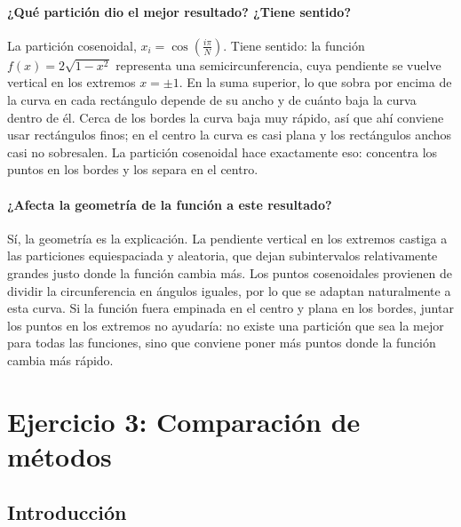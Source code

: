 \paragraph{¿Qué partición dio el mejor resultado? ¿Tiene sentido?}
La partición cosenoidal, \(x_i=\cos\left(\frac{i\pi}{N}\right)\). Tiene sentido: la función \(f(x)=2\sqrt{1-x^2}\) representa una semicircunferencia, cuya pendiente se vuelve vertical en los extremos \(x=\pm1\). En la suma superior, lo que sobra por encima de la curva en cada rectángulo depende de su ancho y de cuánto baja la curva dentro de él. Cerca de los bordes la curva baja muy rápido, así que ahí conviene usar rectángulos finos; en el centro la curva es casi plana y los rectángulos anchos casi no sobresalen. La partición cosenoidal hace exactamente eso: concentra los puntos en los bordes y los separa en el centro.

\paragraph{¿Afecta la geometría de la función a este resultado?}
Sí, la geometría es la explicación. La pendiente vertical en los extremos castiga a las particiones equiespaciada y aleatoria, que dejan subintervalos relativamente grandes justo donde la función cambia más. Los puntos cosenoidales provienen de dividir la circunferencia en ángulos iguales, por lo que se adaptan naturalmente a esta curva. Si la función fuera empinada en el centro y plana en los bordes, juntar los puntos en los extremos no ayudaría: no existe una partición que sea la mejor para todas las funciones, sino que conviene poner más puntos donde la función cambia más rápido.

\section{Ejercicio 3: Comparación de métodos}

\subsection{Introducción}

